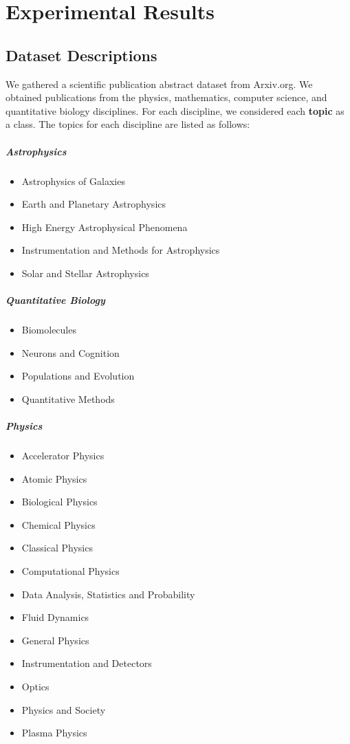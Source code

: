 
\chapter{Experimental Results} \label{Results}

\section{Dataset Descriptions}

We gathered a scientific publication abstract dataset from Arxiv.org. We obtained
publications from the physics, mathematics, computer science, and quantitative biology disciplines.
For each discipline, we considered each \textbf{topic} as a
class. The topics for each discipline are listed as follows:
\paragraph{Astrophysics}
\begin{itemize}
\setlength\itemsep{.0001em}
\item Astrophysics of Galaxies
\item Earth and Planetary Astrophysics
\item High Energy Astrophysical Phenomena
\item Instrumentation and Methods for Astrophysics
\item Solar and Stellar Astrophysics
\end{itemize}
\paragraph{Quantitative Biology}
\begin{itemize}
\setlength\itemsep{.0001em}
\item Biomolecules
\item Neurons and Cognition
\item Populations and Evolution
\item Quantitative Methods
\end{itemize}
\paragraph{Physics}
\begin{itemize}
\setlength\itemsep{.0001em}
\item Accelerator Physics
\item Atomic Physics
\item Biological Physics
\item Chemical Physics
\item Classical Physics
\item Computational Physics
\item Data Analysis, Statistics and Probability
\item Fluid Dynamics
\item General Physics
\item Instrumentation and Detectors
\item Optics
\item Physics and Society
\item Plasma Physics
\end{itemize}
